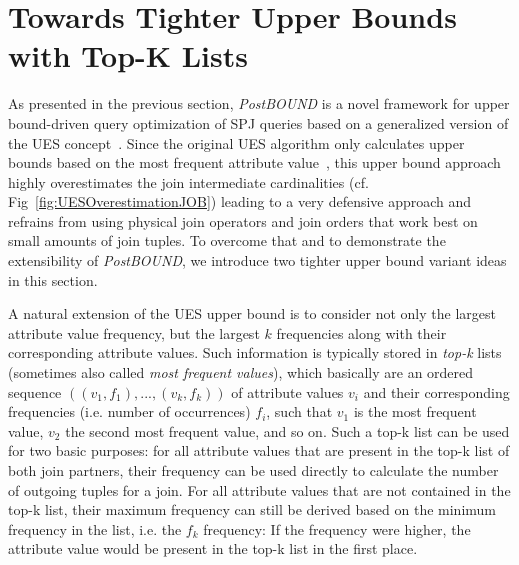 \section{Towards Tighter Upper Bounds with Top-K Lists}
\label{sec:TighterBounds}


As presented in the previous section, \emph{PostBOUND} is a novel framework for upper bound-driven query optimization of SPJ queries based on a generalized version of the UES concept~\cite{hertzschuch-21-ues}. 
Since the original UES algorithm only calculates upper bounds based on the most frequent attribute value~\cite{hertzschuch-21-ues}, this upper bound approach highly overestimates the join intermediate cardinalities (cf. Fig~\ref{fig:UESOverestimationJOB}) leading to a very defensive approach and refrains from using physical join operators and join orders that work best on small amounts of join tuples. 
To overcome that and to demonstrate the extensibility of \emph{PostBOUND}, we introduce two tighter upper bound variant ideas in this section. 

A natural extension of the UES upper bound is to consider not only the largest attribute value frequency, but the largest $k$ frequencies along with their corresponding attribute values. 
Such information is typically stored in \emph{top-k} lists (sometimes also called \emph{most frequent values}), which basically are an ordered sequence $((v_1, f_1), ..., (v_k, f_k))$ of attribute values $v_i$ and their corresponding frequencies (i.e. number of occurrences) $f_i$, such that $v_1$ is the most frequent value, $v_2$ the second most frequent value, and so on.
Such a top-k list can be used for two basic purposes: for all attribute values that are present in the top-k list of both join partners, their frequency can be used directly to calculate the number of outgoing tuples for a join. 
For all attribute values that are not contained in the top-k list, their maximum frequency can still be derived based on the minimum frequency in the list, i.e. the $f_k$ frequency: If the frequency were higher, the attribute value would be present in the top-k list in the first place.

